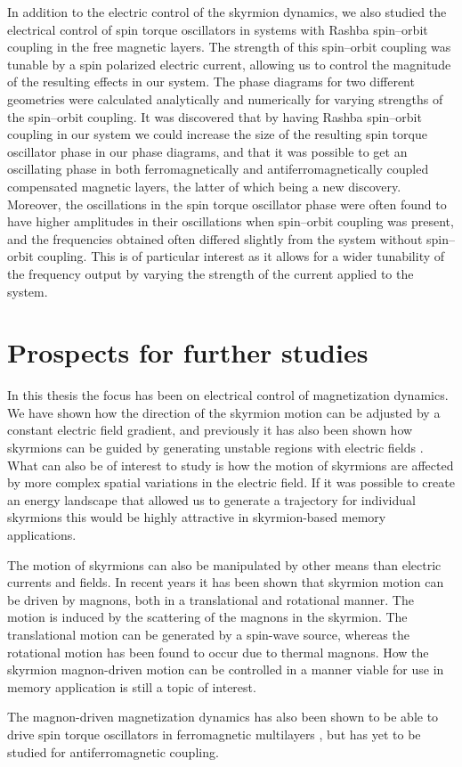 In addition to the electric control of the skyrmion dynamics, we also studied the electrical control of spin torque oscillators in systems with Rashba spin--orbit coupling in the free magnetic layers. The strength of this spin--orbit coupling was tunable by a spin polarized electric current, allowing us to control the magnitude of the resulting effects in our system. The phase diagrams for two different geometries were calculated analytically and numerically for varying strengths of the spin--orbit coupling. It was discovered that by having Rashba spin--orbit coupling in our system we could increase the size of the resulting spin torque oscillator phase in our phase diagrams, and that it was possible to get an oscillating phase in both ferromagnetically and antiferromagnetically coupled compensated magnetic layers, the latter of which being a new discovery. Moreover, the oscillations in the spin torque oscillator phase were often found to have higher amplitudes in their oscillations when spin--orbit coupling was present, and the frequencies obtained often differed slightly from the system without spin--orbit coupling. This is of particular interest as it allows for a wider tunability of the frequency output by varying the strength of the current applied to the system.

\section{Prospects for further studies}
In this thesis the focus has been on electrical control of magnetization dynamics. We have shown how the direction of the skyrmion motion can be adjusted by a constant electric field gradient, and previously it has also been shown how skyrmions can be guided by generating unstable regions with electric fields \cite{Upadhyaya2015}. What can also be of interest to study is how the motion of skyrmions are affected by more complex spatial variations in the electric field. If it was possible to create an energy landscape that allowed us to generate a trajectory for individual skyrmions this would be highly attractive in skyrmion-based memory applications. 

The motion of skyrmions can also be manipulated by other means than electric currents and fields. In recent years it has been shown that skyrmion motion can be driven by magnons, both in a translational \cite{Iwasaki2014} and rotational \cite{Mochizuki2014} manner. The motion is induced by the scattering of the magnons in the skyrmion. The translational motion can be generated by a spin-wave source, whereas the rotational motion has been found to occur due to thermal magnons. How the skyrmion magnon-driven motion can be controlled in a manner viable for use in memory application is still a topic of interest. 

The magnon-driven magnetization dynamics has also been shown to be able to drive spin torque oscillators in ferromagnetic multilayers \cite{Bender2016}, but has yet to be studied for antiferromagnetic coupling.